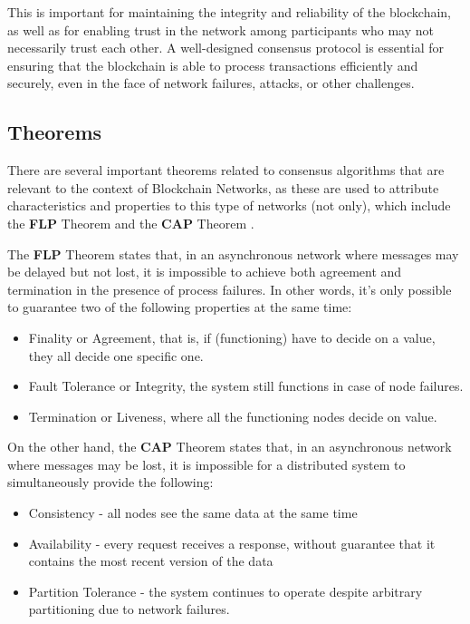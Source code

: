 This is important for maintaining the integrity and reliability of the blockchain, as well as for enabling trust in the network among participants who may not necessarily trust each other. A well-designed consensus protocol is essential for ensuring that the blockchain is able to process transactions efficiently and securely, even in the face of network failures, attacks, or other challenges.




\subsection*{Theorems}
There are several important theorems related to consensus algorithms that are relevant to the context of Blockchain Networks, as these are used to attribute characteristics and properties to this type of networks (not only), which include the \textbf{FLP} Theorem \cite{fischer1985impossibility} and the \textbf{CAP} Theorem \cite{brewer2000towards}.


The \textbf{FLP} Theorem states that, in an asynchronous network where messages may be delayed but not lost, it is impossible to achieve both agreement and termination in the presence of process failures. In other words, it's only possible to guarantee two of the following properties at the same time:
\begin{itemize}
    \item Finality or Agreement, that is, if (functioning) have to decide on a value, they all decide one specific one.
    \item Fault Tolerance or Integrity, the system still functions in case of node failures.
    \item Termination or Liveness, where all the functioning nodes decide on value.
\end{itemize}



On the other hand, the \textbf{CAP} Theorem states that, in an asynchronous network where messages may be lost, it is impossible for a distributed system to simultaneously provide the following:
\begin{itemize}
    \item Consistency - all nodes see the same data at the same time
    \item Availability - every request receives a response, without guarantee that it contains the most recent version of the data
    \item Partition Tolerance - the system continues to operate despite arbitrary partitioning due to network failures.
\end{itemize}

